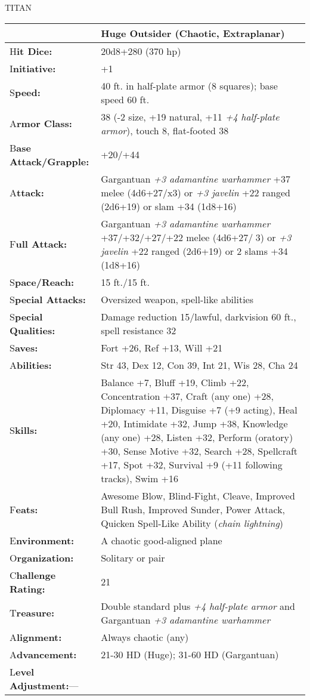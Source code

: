 \documentclass{article}
\begin{document}
\vspace{12pt}
{\LARGE{}TITAN}

\begin{tabular}{|>{\raggedright}p{73pt}|>{\raggedright}p{252pt}|}
\hline
  & Huge Outsider (Chaotic, Extraplanar)\tabularnewline
\hline
H\textbf{it Dice:} & 20d8+280 (370 hp)\tabularnewline
\hline
I\textbf{nitiative:} & +1\tabularnewline
\hline
S\textbf{peed:} & 40 ft. in half-plate armor (8 squares); base speed 60 ft.\tabularnewline
\hline
A\textbf{rmor Class:} & 38 (-2 size, +19 natural, +11 \textit{+4 half-plate armor}), 
touch 8, flat-footed 38\tabularnewline
\hline
B\textbf{ase Attack/Grapple:} & +20/+44\tabularnewline
\hline
A\textbf{ttack:} & Gargantuan \textit{+3 adamantine warhammer }+37 melee (4d6+27/x3) 
or \textit{+3 javelin }+22 ranged (2d6+19) or slam +34 (1d8+16)\tabularnewline
\hline
F\textbf{ull Attack:} & Gargantuan \textit{+3 adamantine warhammer }+37/+32/+27/+22 
melee (4d6+27/3) or \textit{+3 javelin }+22 ranged (2d6+19) or 2 slams +34 (1d8+16)\tabularnewline
\hline
S\textbf{pace/Reach:} & 15 ft./15 ft.\tabularnewline
\hline
S\textbf{pecial Attacks:} & Oversized weapon, spell-like abilities\tabularnewline
\hline
S\textbf{pecial Qualities:} & Damage reduction 15/lawful, darkvision 60 ft., spell 
resistance 32\tabularnewline
\hline
S\textbf{aves:} & Fort +26, Ref +13, Will +21\tabularnewline
\hline
A\textbf{bilities:} & Str 43, Dex 12, Con 39, Int 21, Wis 28, Cha 24\tabularnewline
\hline
S\textbf{kills:} & Balance +7, Bluff +19, Climb +22, Concentration +37, Craft (any 
one) +28, Diplomacy +11, Disguise +7 (+9 acting), Heal +20, Intimidate +32, Jump 
+38, Knowledge (any one) +28, Listen +32, Perform (oratory) +30, Sense Motive +32, 
Search +28, Spellcraft +17, Spot +32, Survival +9 (+11 following tracks), Swim 
+16\tabularnewline
\hline
F\textbf{eats:} & Awesome Blow, Blind-Fight, Cleave, Improved Bull Rush, Improved 
Sunder, Power Attack, Quicken Spell-Like Ability (\textit{chain lightning})\tabularnewline
\hline
E\textbf{nvironment:} & A chaotic good-aligned plane\tabularnewline
\hline
O\textbf{rganization:} & Solitary or pair\tabularnewline
\hline
C\textbf{hallenge Rating:} & 21\tabularnewline
\hline
T\textbf{reasure:} & Double standard plus \textit{+4 half-plate armor }and Gargantuan 
\textit{+3 adamantine warhammer}\tabularnewline
\hline
A\textbf{lignment:} & Always chaotic (any)\tabularnewline
\hline
A\textbf{dvancement:} & 21-30 HD (Huge); 31-60 HD (Gargantuan)\tabularnewline
\hline
L\textbf{evel Adjustment:}--- & \tabularnewline
\hline
\end{tabular}
\end{document}

